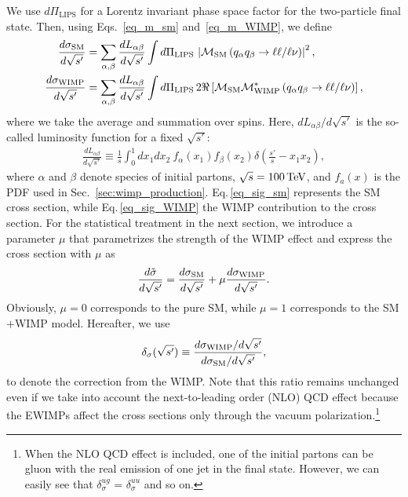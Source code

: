 \documentclass[12pt,twoside,book]{article}
\begin{document}
We use $d\Pi_{\mathrm{LIPS}}$ for a Lorentz invariant phase space factor for the two-particle final state.
Then, using Eqs.~\eqref{eq_m_sm} and~\eqref{eq_m_WIMP}, we define
\begin{align}
 \frac{d \sigma_{\rm SM}}{d\sqrt{s'}} &= \sum_{\alpha, \beta}
 \frac{dL_{\alpha \beta}}{d\sqrt{s'}} \int d\Pi_{\mathrm{LIPS}}\, \left| \mathcal{M}_{\rm SM} \left( q_\alpha q_\beta \to \ell\ell / \ell\nu \right) \right|^2,\label{eq_sig_sm}\\
 \frac{d \sigma_{\rm WIMP}}{d\sqrt{s'}} &= \sum_{\alpha, \beta}
 \frac{dL_{\alpha \beta}}{d\sqrt{s'}} \int d\Pi_{\mathrm{LIPS}}\, 2 \Re \left[ \mathcal{M}_{\rm SM}
 \mathcal{M}_{\rm WIMP}^{*} \left( q_\alpha q_\beta \to \ell\ell / \ell\nu
 \right) \right],\label{eq_sig_WIMP}
\end{align}
where we take the average and summation over spins.
Here, $dL_{\alpha \beta} / d\sqrt{s'}$ is the so-called luminosity function for a fixed
$\sqrt{s'}$:
\begin{align}
 \frac{d L_{\alpha \beta}}{d\sqrt{s'}} \equiv \frac{1}{s} \int_0^1 dx_1
 dx_2~f_\alpha(x_1) f_\beta(x_2) \delta\left(\frac{s'}{s} - x_1 x_2\right),
\end{align}
where $\alpha$ and $\beta$ denote species of initial partons, $\sqrt{s} = 100\,{\rm TeV}$, and $f_a(x)$ is the PDF used in Sec.~\ref{sec:wimp_production}.
Eq.\,\eqref{eq_sig_sm} represents the SM cross section, while Eq.\,\eqref{eq_sig_WIMP} the WIMP contribution to the cross section.
For the statistical treatment in the next section, we introduce a parameter $\mu$ that parametrizes the strength of the WIMP effect and express the cross section with $\mu$ as
\begin{align}
 \frac{d\tilde{\sigma}}{d\sqrt{s'}} =
 \frac{d\sigma_{\rm SM}}{d\sqrt{s'}}
 + \mu \frac{d\sigma_{\rm WIMP}}{d\sqrt{s'}}.
 \label{eq_diffcrosssection}
\end{align}
Obviously, $\mu=0$ corresponds to the pure SM, while $\mu=1$ corresponds to the SM$+$WIMP model.
Hereafter, we use
\begin{align}
 \delta_\sigma ( \sqrt{s'} ) \equiv \frac{d\sigma_{\rm
 WIMP} / d\sqrt{s'}}{d\sigma_{\rm SM} /
 d\sqrt{s'}},\label{eq_dsigma}
\end{align}
to denote the correction from the WIMP.
Note that this ratio remains unchanged even if we take into account the next-to-leading order (NLO) QCD effect because the EWIMPs affect the cross sections only through the vacuum polarization.\footnote
{
  When the NLO QCD effect is included, one of the initial partons can be gluon with the real emission of one jet in the final state.
  However, we can easily see that $\delta_\sigma^{ug}$ = $\delta_\sigma^{uu}$ and so on.
}
\end{document}
